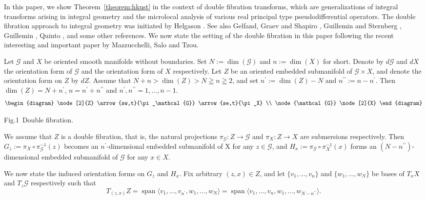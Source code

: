 \documentclass[a4paper,11pt,reqno]{amsart}
\theoremstyle{definition}
\theoremstyle{remark}
\begin{document}
%
%
\par
%
%
In this paper, we show Theorem~\ref{theorem:hkust} in the context of double fibration transforms, which are generalizations of integral transforms arising in integral geometry and the microlocal analysis of various real principal type pseudodifferential operators. The double fibration approach to integral geometry was initiated by Helgason \cite{Helgason}. See also Gelfand, Graev and Shapiro \cite{GelfandGraevShapiro}, Guillemin and Sternberg \cite{GuilleminSternberg}, Guillemin \cite{Guillemin}, Quinto \cite{Quinto}, and some other references. We now state the setting of the double fibration in this paper following the recent interesting and important paper \cite{MazzucchelliSaloTzou} by Mazzucchelli, Salo and Tzou. 
%
\par
%
Let $\mathcal{G}$ and $X$ be oriented smooth manifolds without boundaries. 
Set $N:=\dim(\mathcal{G})$ and $n:=\dim(X)$ for short. 
Denote by $d\mathcal{G}$ and $dX$ the orientation form of $\mathcal{G}$ 
and the orientation form of $X$ respectively. 
Let $Z$ be an oriented embedded submanifold of $\mathcal{G}{\times}X$, 
and denote the orientation form on $Z$ by $dZ$.    
Assume that $N+n > \dim(Z) > N \geqq n \geqq 2$, and 
set $n^\prime:=\dim(Z)-N$ and $n^{\prime\prime}:=n-n^\prime$. 
Then $\dim(Z)=N+n^\prime$, $n=n^\prime+n^{\prime\prime}$ and $n^\prime,n^{\prime\prime}=1,\dotsc,n-1$. 
%
%
$$
\begin{diagram}
\node[2]{Z} \arrow{sw,t}{\pi_\mathcal{G}} \arrow{se,t}{\pi_X}
\\
\node{\mathcal{G}} \node[2]{X}  
\end{diagram}
$$
\begin{center}
Fig.1\ Double fibration. 
\end{center}
%
%
We assume that $Z$ is a double fibration, that is, 
the natural projections
$\pi_\mathcal{G}:Z{\rightarrow}\mathcal{G}$ and 
$\pi_X:Z{\rightarrow}X$ are submersions respectively. 
Then $G_z:=\pi_X\circ\pi_\mathcal{G}^{-1}(z)$ becomes an 
$n^\prime$-dimensional embedded submanifold of X for any $z \in \mathcal{G}$, 
and $H_x:=\pi_\mathcal{G}\circ\pi_X^{-1}(x)$ forms an 
$(N-n^{\prime\prime})$-dimensional embedded submanifold of $\mathcal{G}$ for any $x \in X$. 
%
\par
%
We now state the induced orientation forms on $G_z$ and $H_x$. 
Fix arbitrary $(z,x) \in Z$, 
and let $\{v_1,\dotsc,v_n\}$ and $\{w_1,\dotsc,w_N\}$ be bases of 
$T_xX$ and $T_z\mathcal{G}$ respectively such that 
%
%
$$
T_{(z,x)}Z
=
\operatorname{span}\langle{v_1,\dotsc,v_{n^\prime},w_1,\dotsc,w_N}\rangle
=
\operatorname{span}\langle{v_1,\dotsc,v_n,w_1,\dotsc,w_{N-n^{\prime\prime}}}\rangle.
$$
\end{document}
